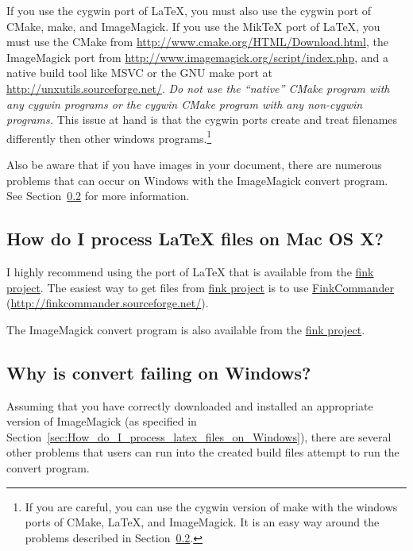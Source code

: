 \documentclass{article}
\newcommand*{\textfile}[1]{\textsf{#1}}
\newcommand*{\textprog}[1]{\textfile{#1}}
\newcommand*{\latex}{\LaTeX\xspace}
\newcommand*{\miktex}{Mik\TeX\xspace}
\begin{document}
  If you use the cygwin port of \latex, you must also use the cygwin port
  of CMake, make, and ImageMagick. If you use the \miktex port of \latex,
  you must use the CMake from
  \href{http://www.cmake.org/HTML/Download.html}{http://www.cmake.org/HTML/Download.html},
  the ImageMagick port from
  \href{http://www.imagemagick.org/script/index.php}{http://www.imagemagick.org/script/index.php},
  and a native build tool like MSVC or the GNU make port at
  \href{http://unxutils.sourceforge.net/}{http://unxutils.sourceforge.net/}.
  \emph{Do not use the ``native'' CMake program with any cygwin programs or
  the cygwin CMake program with any non-cygwin programs.} This issue at
  hand is that the cygwin ports create and treat filenames differently then
  other windows programs.\footnote{If you are careful, you can use the
  cygwin version of make with the windows ports of CMake, \latex, and
  ImageMagick.  It is an easy way around the problems described in
  Section~\ref{sec:Why_is_convert_failing_on_Windows}.}

  Also be aware that if you have images in your document, there are
  numerous problems that can occur on Windows with the ImageMagick convert
  program. See Section~\ref{sec:Why_is_convert_failing_on_Windows} for more
  information.

  \subsection{How do I process \latex files on Mac OS X?}
  \label{sec:How_do_I_process_latex_files_on_Mac_OS_X}

  I highly recommend using the port of \latex that is available from the
  \href{http://www.finkproject.org/}{fink project}. The easiest way to get
  files from \href{http://www.finkproject.org/}{fink project} is to use
  \href{http://finkcommander.sourceforge.net/}{FinkCommander}
  (\href{http://finkcommander.sourceforge.net/}{http://finkcommander.sourceforge.net/}).

  The ImageMagick \textprog{convert} program is also available from the
  \href{http://www.finkproject.org/}{fink project}.

  \subsection{Why is convert failing on Windows?}
  \label{sec:Why_is_convert_failing_on_Windows}

  Assuming that you have correctly downloaded and installed an appropriate
  version of ImageMagick (as specified in
  Section~\ref{sec:How_do_I_process_latex_files_on_Windows}), there are several
  other problems that users can run into the created build files attempt to
  run the convert program.
\end{document}
